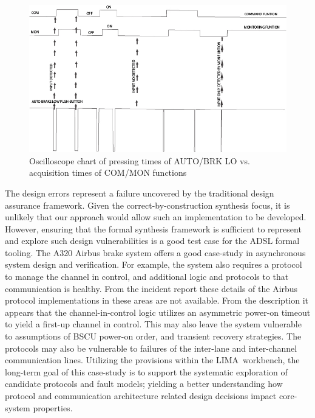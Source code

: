 \begin{figure}
\begin{center}
\includegraphics[width=\textwidth]{figures/newtrace.jpg}
\caption{Oscilloscope chart of pressing times of AUTO/BRK LO vs. acquisition times of COM/MON functions}
\label{fig:push_button_sampling}
\end{center}
\end{figure}

 The design errors represent a failure uncovered by the traditional design assurance
 framework.  Given the correct-by-construction synthesis focus, it is unlikely
 that our approach would allow such an implementation to be developed.  However,
 ensuring that the formal synthesis framework is sufficient to represent and
 explore such design vulnerabilities is a good test case for the ADSL formal
 tooling.  The A320 Airbus brake system offers a good case-study in asynchronous system design and verification. For example, the system also
 requires a protocol to manage the channel in control, and additional logic and
 protocols to that communication is healthy.  From the incident report these
 details of the Airbus protocol implementations in these areas are not
 available. From the description it appears that the channel-in-control logic
 utilizes an asymmetric power-on timeout to yield a first-up channel in
 control. This may also leave the system vulnerable to assumptions of BSCU
 power-on order, and transient recovery strategies.  The protocols may also be
 vulnerable to failures of the inter-lane and inter-channel communication lines.
  Utilizing the provisions within the LIMA\ workbench, the long-term goal
of this case-study is to support the systematic exploration of candidate
protocols and fault models; yielding a better understanding how protocol
and communication architecture related design decisions impact core-system
properties.
